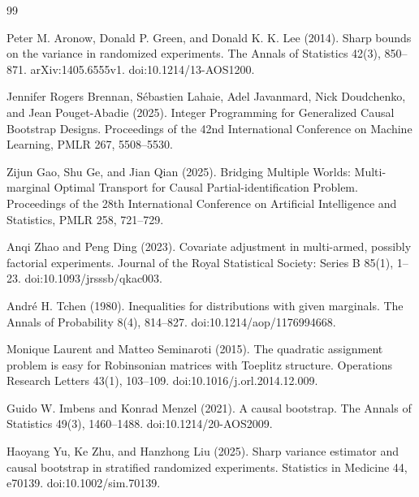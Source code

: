 \documentclass{article}
\begin{document}
\begin{thebibliography}{99}

   Peter M. Aronow, Donald P. Green, and Donald K. K. Lee (2014). Sharp bounds on the variance in randomized experiments. The Annals of Statistics 42(3), 850--871. arXiv:1405.6555v1. doi:10.1214/13-AOS1200.

   Jennifer Rogers Brennan, S\'{e}bastien Lahaie, Adel Javanmard, Nick Doudchenko, and Jean Pouget-Abadie (2025). Integer Programming for Generalized Causal Bootstrap Designs. Proceedings of the 42nd International Conference on Machine Learning, PMLR 267, 5508--5530.

   Zijun Gao, Shu Ge, and Jian Qian (2025). Bridging Multiple Worlds: Multi-marginal Optimal Transport for Causal Partial-identification Problem. Proceedings of the 28th International Conference on Artificial Intelligence and Statistics, PMLR 258, 721--729.

   Anqi Zhao and Peng Ding (2023). Covariate adjustment in multi-armed, possibly factorial experiments. Journal of the Royal Statistical Society: Series B 85(1), 1--23. doi:10.1093/jrsssb/qkac003.

   Andr\'{e} H. Tchen (1980). Inequalities for distributions with given marginals. The Annals of Probability 8(4), 814--827. doi:10.1214/aop/1176994668.

   Monique Laurent and Matteo Seminaroti (2015). The quadratic assignment problem is easy for Robinsonian matrices with Toeplitz structure. Operations Research Letters 43(1), 103--109. doi:10.1016/j.orl.2014.12.009.

   Guido W. Imbens and Konrad Menzel (2021). A causal bootstrap. The Annals of Statistics 49(3), 1460--1488. doi:10.1214/20-AOS2009.

   Haoyang Yu, Ke Zhu, and Hanzhong Liu (2025). Sharp variance estimator and causal bootstrap in stratified randomized experiments. Statistics in Medicine 44, e70139. doi:10.1002/sim.70139.

\end{thebibliography}
\end{document}
